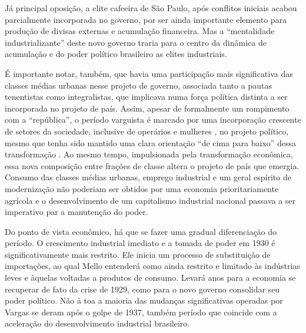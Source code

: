 Já principal oposição, a elite cafeeira de São Paulo, após conflitos
iniciais acabou parcialmente incorporada no governo, por ser 
ainda importante elemento para produção de divisas externas e
acumulação financeira. Mas a ``mentalidade industrializante''
\citep{perissinotto_ideias_2023} deste novo governo traria para o centro da dinâmica de
acumulação e do poder político brasileiro as elites industriais.

É importante notar, também, que havia uma participação mais
significativa das classes médias urbanas nesse projeto de governo,
associada tanto a pautas tenentistas como integralistas, que implicava
numa força política distinta a ser incorporada no projeto de país.
Assim, apesar de formalmente um rompimento com a ``república'', o
período varguista é marcado por uma incorporação crescente de setores da
sociedade, inclusive de operários e mulheres \citep{schwarcz_brasil_2015},
no projeto político, mesmo que tenha sido mantido uma clara orientação ``de cima
para baixo'' dessa transformação  .
Ao mesmo tempo, impulsionada pela
transformação econômica, essa nova composição entre frações de classe 
altera o projeto de país que emergia. Consumo das
classes médias urbanas, emprego industrial e um geral espírito de
modernização não poderiam ser obtidos por uma economia prioritariamente
agrícola e o desenvolvimento de um capitalismo industrial nacional
passava a ser imperativo par a manutenção do poder.

\begin{esboco}
\end{esboco}

Do ponto de vista econômico, há que se fazer uma gradual diferenciação
do período. O crescimento industrial imediato e a tomada de poder em
1930 é significativamente mais restrito. Ele inicia um processo de
substituição de importações, ao qual Mello \citeyearpar{mello1982} entenderá como
ainda restrito e limitado às indústrias leves e àquelas voltadas a produtos de consumo.
Levará anos para a economia se recuperar de fato da crise de
1929, como para o novo governo consolidar seu poder político. Não à toa
a maioria das mudanças significativas operadas por Vargas se deram
após o golpe de 1937, também período que coincide com a aceleração do
desenvolvimento industrial brasileiro.

